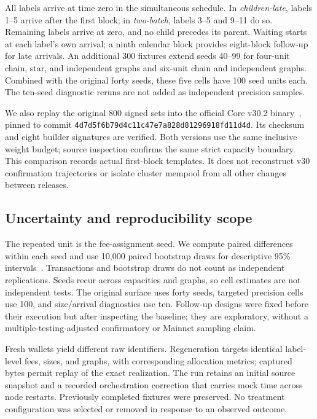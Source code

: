 \documentclass[conference]{IEEEtran}
\begin{document}
All labels arrive at time zero in the simultaneous schedule. In \emph{children-late}, labels 1--5 arrive after the first block; in \emph{two-batch}, labels 3--5 and 9--11 do so. Remaining labels arrive at zero, and no child precedes its parent. Waiting starts at each label's own arrival; a ninth calendar block provides eight-block follow-up for late arrivals. An additional 300 fixtures extend seeds 40--99 for four-unit chain, star, and independent graphs and six-unit chain and independent graphs. Combined with the original forty seeds, these five cells have 100 seed units each. The ten-seed diagnostic reruns are not added as independent precision samples.

We also replay the original 800 signed sets into the official Core v30.2 binary~\cite{bitcoin_core30}, pinned to commit \texttt{4d7d5f6b79d4c11c47e7a828d81296918fd11d4d}. Its checksum and eight builder signatures are verified. Both versions use the same inclusive weight budget; source inspection confirms the same strict capacity boundary. This comparison records actual first-block templates. It does not reconstruct v30 confirmation trajectories or isolate cluster mempool from all other changes between releases.

\subsection{Uncertainty and reproducibility scope}
The repeated unit is the fee-assignment seed. We compute paired differences within each seed and use 10,000 paired bootstrap draws for descriptive 95\% intervals~\cite{efron1979}. Transactions and bootstrap draws do not count as independent replications. Seeds recur across capacities and graphs, so cell estimates are not independent tests. The original surface uses forty seeds, targeted precision cells use 100, and size/arrival diagnostics use ten. Follow-up designs were fixed before their execution but after inspecting the baseline; they are exploratory, without a multiple-testing-adjusted confirmatory or Mainnet sampling claim.

Fresh wallets yield different raw identifiers. Regeneration targets identical label-level fees, sizes, and graphs, with corresponding allocation metrics; captured bytes permit replay of the exact realization. The run retains an initial source snapshot and a recorded orchestration correction that carries mock time across node restarts. Previously completed fixtures were preserved. No treatment configuration was selected or removed in response to an observed outcome.
\end{document}
